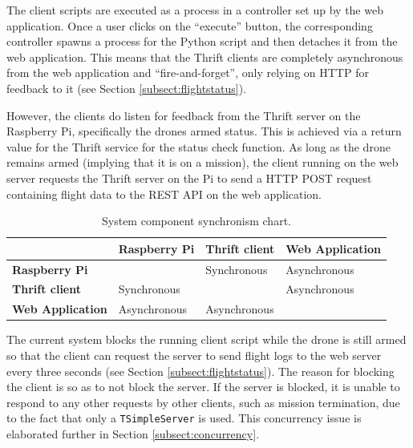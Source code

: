 The client scripts are executed as a process in a controller set up by the web application. Once a user clicks on the ``execute'' button, the corresponding controller spawns a process for the Python script and then detaches it from the web application. This means that the Thrift clients are completely asynchronous from the web application and ``fire-and-forget'', only relying on HTTP for feedback to it (see Section \ref{subsect:flightstatus}). 

However, the clients do listen for feedback from the Thrift server on the Raspberry Pi, specifically the drone\textquotesingle s armed status. This is achieved via a return value for the Thrift service for the status check function. As long as the drone remains armed (implying that it is on a mission), the client running on the web server requests the Thrift server on the Pi to send a HTTP POST request containing flight data to the REST API on the web application. 

\begin{table}[t]
 \caption{System component synchronism chart.}
 \begin{center}
     \begin{tabular}{|m{3cm}|m{3cm}|m{3cm}|m{3cm}|} 
     \hline
      & \bf Raspberry Pi & \bf Thrift client & \bf Web Application\\ 
     \hline
     \bf Raspberry Pi &  & Synchronous & Asynchronous\\
     \hline
     \bf Thrift client & Synchronous & & Asynchronous\\
     \hline
     \bf Web Application & Asynchronous & Asynchronous & \\
     \hline
 \end{tabular}
 \end{center}{}
 \label{table:synch}
\end{table}
\FloatBarrier

The current system blocks the running client script while the drone is still armed so that the client can request the server to send flight logs to the web server every three seconds (see Section \ref{subsect:flightstatus}). The reason for blocking the client is so as to not block the server. If the server is blocked, it is unable to respond to any other requests by other clients, such as mission termination, due to the fact that only a \texttt{TSimpleServer} is used. This concurrency issue is elaborated further in Section \ref{subsect:concurrency}.


